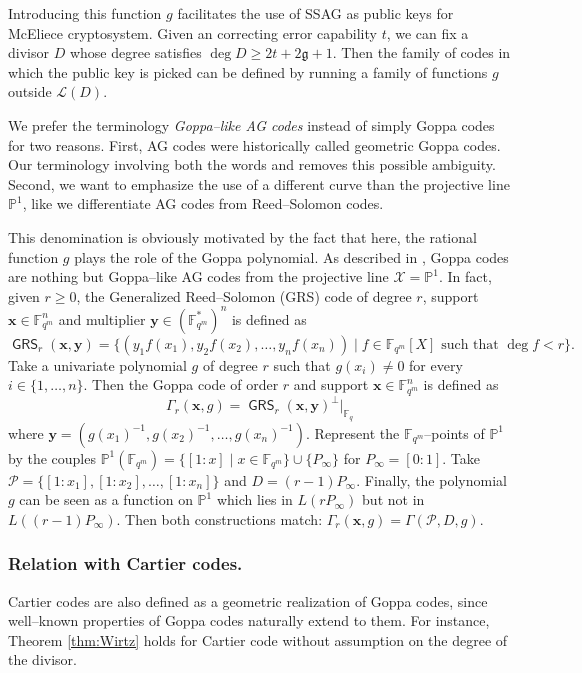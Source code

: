 \documentclass[a4paper]{amsart}
\theoremstyle{definition}
\theoremstyle{remark}
\newcommand{\calP}{\mathcal{P}}
\newcommand{\calL}{\mathcal{L}}
\newcommand{\calX}{\mathcal{X}}
\newcommand{\fqm}{\mathbb{F}_{q^m}}
\newcommand{\fq}{\mathbb{F}_{q}}
\newcommand{\PP}{\mathbb{P}}
\newcommand{\GRS}{\operatorname{\mathsf{GRS}}}
\begin{document}
Introducing this function $g$ facilitates the use of SSAG as public keys for McEliece cryptosystem. Given an correcting error capability $t$, we can fix a divisor $D$ whose degree satisfies $\deg D \geq 2t + 2\mathfrak{g}+1$. Then the family of codes in which the public key is picked can be defined by running a family of functions $g$ outside $\calL(D)$.

\medskip

We prefer the terminology \emph{Goppa--like AG codes} instead of simply Goppa codes for two reasons. First, AG codes were historically called geometric Goppa codes. Our terminology involving both the words  and  removes this possible ambiguity. Second, we want to emphasize the use of a different curve than the projective line $\PP^1$, like we differentiate AG codes from Reed--Solomon codes.

This denomination is obviously motivated by the fact that here, the rational function $g$ plays the role of the Goppa polynomial. As described in \cite[Example~9.1.8]{Sti09}, Goppa codes are nothing but Goppa--like AG codes from the projective line $\calX=\PP^1$. In fact, given $r \geq 0$, the Generalized Reed--Solomon (GRS) code of degree $r$, support $\mathbf{x} \in \fqm^n$ and multiplier $\mathbf{y} \in (\fqm^*)^n$ is defined as
\[\GRS_r(\mathbf{x},\mathbf{y})=\{(y_1f(x_1),y_2f(x_2),\dots,y_nf(x_n)) \mid f \in \fqm[X] \text{ such that } \deg f < r \}.\]
Take a univariate polynomial $g$ of degree $r$ such that $g(x_i) \neq 0$ for every  $i \in \{1,\dots,n\}$. Then the Goppa code of order $r$ and support $\mathbf{x} \in \fqm^n$ is defined as
\[\Gamma_r(\mathbf{x},g)= \GRS_r(\mathbf{x},\mathbf{y})^\perp|_{\fq}\]
where $\mathbf{y}=(g(x_1)^{-1},g(x_2)^{-1},\dots,g(x_n)^{-1})$.
Represent the $\fqm$--points of $\PP^1$ by the couples $\PP^1(\fqm)=\{[1:x] \mid x \in \fqm\} \cup \{P_\infty\}$ for $P_\infty=[0:1]$. Take $\calP=\{[1:x_1],[1:x_2],\dots,[1:x_n]\}$ and $D=(r-1)P_\infty$. Finally, the polynomial $g$ can be seen as a function on $\PP^1$ which lies in $L(rP_\infty)$ but not in $L((r-1)P_\infty)$. Then both constructions match: $\Gamma_r(\mathbf{x},g)=\Gamma(\calP,D,g)$.

\subsubsection{Relation with Cartier codes.} Cartier codes \cite{Cou14} are also defined as a geometric realization of Goppa codes, since well--known properties of Goppa codes naturally extend to them. For instance, Theorem \ref{thm:Wirtz} holds for Cartier code without assumption on the degree of the divisor.
\end{document}
